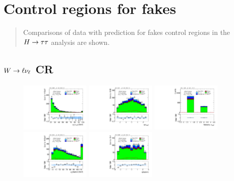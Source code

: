 \chapter[Control regions for fakes][Control regions for fakes]{Control regions for fakes}
\label{apx:control-regions}

\begin{quote}
Comparisons of data with prediction for fakes control regions in the $H\rightarrow\tau\tau$ analysis are shown.
\end{quote}

\section{$W \rightarrow \ell\nu_\ell$ CR}

\begin{figure}[tp]
  \centering
  \includegraphics[width=0.30\textwidth]{figures/analysis/vbf-WlvCR/tau-pt}
  \includegraphics[width=0.30\textwidth]{figures/analysis/vbf-WlvCR/tau-eta}
  \includegraphics[width=0.30\textwidth]{figures/analysis/vbf-WlvCR/tau-numTrack}
  \includegraphics[width=0.30\textwidth]{figures/analysis/vbf-WlvCR/lep-pt-hi}
  \includegraphics[width=0.30\textwidth]{figures/analysis/vbf-WlvCR/lep-eta}

\end{figure}
